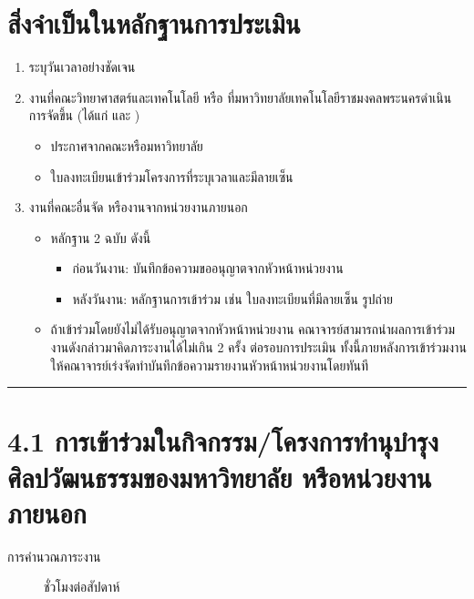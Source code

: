 \documentclass[a4paper,12pt,english]{sphinxmanual}
\begin{document}
\section{สิ่งจำเป็นในหลักฐานการประเมิน}
\label{\detokenize{4culture:id3}}\begin{enumerate}
%
\item {} 
 ระบุวันเวลาอย่างชัดเจน

\item {} 
งานที่คณะวิทยาศาสตร์และเทคโนโลยี หรือ ที่มหาวิทยาลัยเทคโนโลยีราชมงคลพระนครดำเนินการจัดขึ้น (ได้แก่ {\hyperref[\detokenize{4culture:id4}]{}} และ {\hyperref[\detokenize{4culture:id13}]{}})
\begin{itemize}
\item {} 
ประกาศจากคณะหรือมหาวิทยาลัย 

\item {} 
ใบลงทะเบียนเข้าร่วมโครงการที่ระบุเวลาและมีลายเซ็น

\end{itemize}

\item {} 
งานที่คณะอื่นจัด หรืองานจากหน่วยงานภายนอก
\begin{itemize}
\item {} 
หลักฐาน 2 ฉบับ ดังนี้
\begin{itemize}
\item {} 
ก่อนวันงาน: บันทึกข้อความขออนุญาตจากหัวหน้าหน่วยงาน

\item {} 
หลังวันงาน: หลักฐานการเข้าร่วม เช่น ใบลงทะเบียนที่มีลายเซ็น รูปถ่าย

\end{itemize}

\item {} 
ถ้าเข้าร่วมโดยยังไม่ได้รับอนุญาตจากหัวหน้าหน่วยงาน คณาจารย์สามารถนำผลการเข้าร่วมงานดังกล่าวมาคิดภาระงานได้ไม่เกิน 2 ครั้ง ต่อรอบการประเมิน ทั้งนี้ภายหลังการเข้าร่วมงานให้คณาจารย์เร่งจัดทำบันทึกข้อความรายงานหัวหน้าหน่วยงานโดยทันที

\end{itemize}

\end{enumerate}


\bigskip\hrule\bigskip



\section{4.1 การเข้าร่วมในกิจกรรม/โครงการทำนุบำรุงศิลปวัฒนธรรมของมหาวิทยาลัย หรือหน่วยงานภายนอก}
\label{\detokenize{4culture:id4}}\label{\detokenize{4culture:id5}}\begin{description}
\item[{การคำนวณภาระงาน}]  ชั่วโมงต่อสัปดาห์

\end{description}
\end{document}
